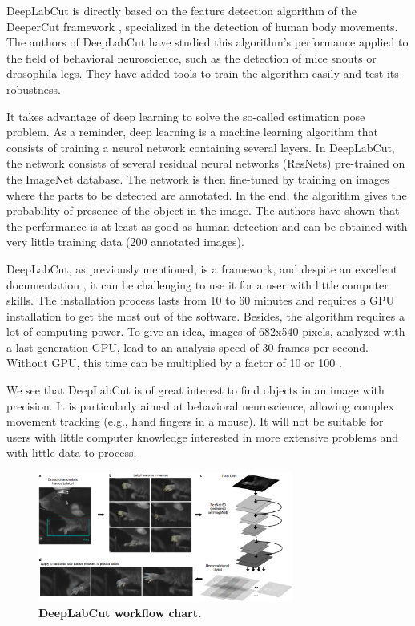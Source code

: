    DeepLabCut is directly based on the feature detection algorithm of the DeeperCut framework \cite{insafutdinov2016deepercut}, specialized in the detection of human body movements. The authors of DeepLabCut have studied this algorithm's performance applied to the field of behavioral neuroscience, such as the detection of mice snouts or drosophila legs. They have added tools to train the algorithm easily and test its robustness.

    It takes advantage of deep learning to solve the so-called estimation pose problem. As a reminder, deep learning is a machine learning algorithm that consists of training a neural network containing several layers. In DeepLabCut, the network consists of several residual neural networks (ResNets) pre-trained on the ImageNet database. The network is then fine-tuned by training on images where the parts to be detected are annotated. In the end, the algorithm gives the probability of presence of the object in the image. The authors have shown that the performance is at least as good as human detection and can be obtained with very little training data (200 annotated images).

    DeepLabCut, as previously mentioned, is a framework, and despite an excellent documentation \cite{nath2019using}, it can be challenging to use it for a user with little computer skills. The installation process lasts from 10 to 60 minutes and requires a GPU installation to get the most out of the software. Besides, the algorithm requires a lot of computing power. To give an idea, images of 682x540 pixels, analyzed with a last-generation GPU, lead to an analysis speed of 30 frames per second. Without GPU, this time can be multiplied by a factor of 10 or 100 \cite{mathis2018inference}.

    We see that DeepLabCut is of great interest to find objects in an image with precision. It is particularly aimed at behavioral neuroscience, allowing complex movement tracking (e.g., hand fingers in a mouse). It will not be suitable for users with little computer knowledge interested in more extensive problems and with little data to process.

    \begin{figure}[h]
    \centering
    \includegraphics[width=0.75\textwidth]{part_1/assets/deeplabcut.png}
    \caption{{\bf DeepLabCut workflow chart.}}
    \label{part_1:deeplabcut}
    \end{figure}


